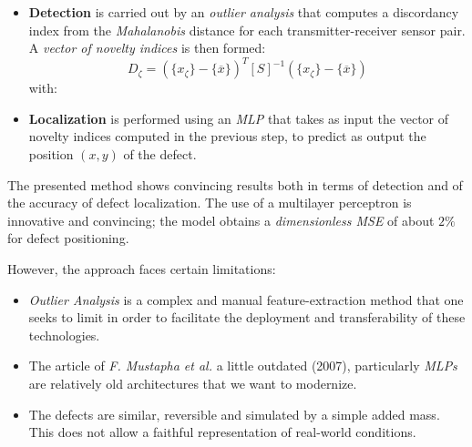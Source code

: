 \documentclass[12pt]{article}
\begin{document}
\begin{itemize}[itemsep=8pt]
    
    \item \textbf{Detection} is carried out by an \textit{outlier analysis} that computes a discordancy index from the \textit{Mahalanobis} distance for each transmitter-receiver sensor pair. A \textit{vector of novelty indices} is then formed:
    $$
    D_{\zeta} = (\{x_{\zeta}\} - \{\overline{x}\})^T [S]^{-1} (\{x_{\zeta}\} - \{\overline{x}\})
    $$
    with: 
 
 
    \item \textbf{Localization} is performed using an \textit{MLP} that takes as input the vector of novelty indices computed in the previous step, to predict as output the position $(x, y)$ of the defect.
    
\end{itemize}
 
The presented method shows convincing results both in terms of detection and of the accuracy of defect localization. The use of a multilayer perceptron is innovative and convincing; the model obtains a \textit{dimensionless MSE} of about $2\%$ for defect positioning.
 
However, the approach faces certain limitations:
 
\begin{itemize}[itemsep=8pt]
    
    \item \textit{Outlier Analysis} is a complex and manual feature-extraction method that one seeks to limit in order to facilitate the deployment and transferability of these technologies.

    \item The article of \textit{F. Mustapha et al.} \cite{MUSTAPHA20071885} a little outdated (2007), particularly \textit{MLPs} are relatively old architectures that we want to modernize.
    
    \item The defects are similar, reversible and simulated by a simple added mass. This does not allow a faithful representation of real-world conditions.
    
\end{itemize}
 
\end{document}
